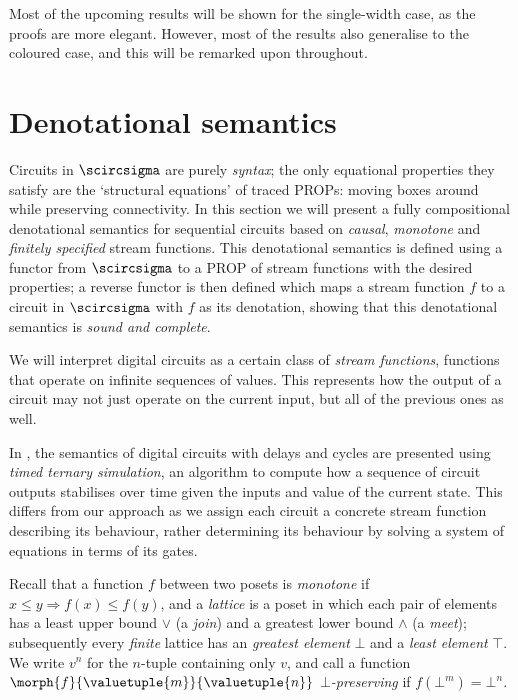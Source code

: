\documentclass{lmcs}
\begin{document}
Most of the upcoming results will be shown for the single-width case, as the
proofs are more elegant.
However, most of the results also generalise to the coloured case, and this will
be remarked upon throughout.

\section{Denotational semantics}

Circuits in \(\scircsigma\) are purely \emph{syntax}; the only equational
properties they satisfy are the `structural equations' of traced PROPs: moving
boxes around while preserving connectivity.
In this section we will present a fully compositional denotational
semantics for sequential circuits based on \emph{causal}, \emph{monotone} and
\emph{finitely specified} stream functions.
This denotational semantics is defined using a functor from \(\scircsigma\) to a
PROP of stream functions with the desired properties; a reverse functor is then
defined which maps a stream function \(f\) to a circuit in \(\scircsigma\) with
\(f\) as its denotation, showing that this denotational semantics is
\emph{sound and complete}.

We will interpret digital circuits as a certain class of
\emph{stream functions}, functions that operate on infinite sequences of values.
This represents how the output of a circuit may not just operate on the current
input, but all of the previous ones as well.

\begin{rem}
    In \cite{mendler2012constructive}, the semantics of digital circuits with
    delays and cycles are presented using \emph{timed ternary simulation}, an
    algorithm to compute how a sequence of circuit outputs stabilises over time
    given the inputs and value of the current state.
    This differs from our approach as we assign each circuit a concrete stream
    function describing its behaviour, rather determining its behaviour by
    solving a system of equations in terms of its gates.
\end{rem}

Recall that a function \(f\) between two posets is \emph{monotone}
if \(x \leq y \Rightarrow f(x) \leq f(y)\), and a \emph{lattice} is a poset
in which each pair of elements has a least upper bound \(\vee\) (a \emph{join})
and a greatest lower bound \(\wedge\) (a \emph{meet}); subsequently
every \emph{finite} lattice has an \emph{greatest element} \(\bot\) and a
\emph{least element} \(\top\).
We write \(v^n\) for the \(n\)-tuple containing only \(v\), and call a function
\(\morph{f}{\valuetuple{m}}{\valuetuple{n}}\) \emph{\(\bot\)-preserving} if
\(f(\bot^m) = \bot^n\).
\end{document}
